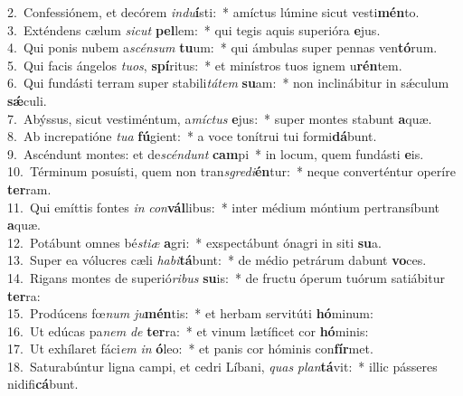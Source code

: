 {2.~}Confessiónem, et decórem \textit{in}\textit{du}\textbf{í}sti:~* amíctus lúmine sicut vesti\textbf{mén}to.\\
{3.~}Exténdens cælum \textit{si}\textit{cut} \textbf{pel}lem:~* qui tegis aquis superióra \textbf{e}jus.\\
{4.~}Qui ponis nubem a\textit{scén}\textit{sum} \textbf{tu}um:~* qui ámbulas super pennas ven\textbf{tó}rum.\\
{5.~}Qui facis ángelos \textit{tu}\textit{os}, \textbf{spí}ritus:~* et minístros tuos ignem u\textbf{rén}tem.\\
{6.~}Qui fundásti terram super stabili\textit{tá}\textit{tem} \textbf{su}am:~* non inclinábitur in sǽculum \textbf{sǽ}culi.\\
{7.~}Abýssus, sicut vestiméntum, a\textit{mí}\textit{ctus} \textbf{e}jus:~* super montes stabunt \textbf{a}quæ.\\
{8.~}Ab increpatióne \textit{tu}\textit{a} \textbf{fú}gient:~* a voce tonítrui tui formi\textbf{dá}bunt.\\
{9.~}Ascéndunt montes: et de\textit{scén}\textit{dunt} \textbf{cam}pi~* in locum, quem fundásti \textbf{e}is.\\
{10.~}Términum posuísti, quem non tran\textit{sgre}\textit{di}\textbf{én}tur:~* neque converténtur operíre \textbf{ter}ram.\\
{11.~}Qui emíttis fontes \textit{in} \textit{con}\textbf{vál}libus:~* inter médium móntium pertransíbunt \textbf{a}quæ.\\
{12.~}Potábunt omnes bé\textit{sti}\textit{æ} \textbf{a}gri:~* exspectábunt ónagri in siti \textbf{su}a.\\
{13.~}Super ea vólucres cæli \textit{ha}\textit{bi}\textbf{tá}bunt:~* de médio petrárum dabunt \textbf{vo}ces.\\
{14.~}Rigans montes de superió\textit{ri}\textit{bus} \textbf{su}is:~* de fructu óperum tuórum satiábitur \textbf{ter}ra:\\
{15.~}Prodúcens fœ\textit{num} \textit{ju}\textbf{mén}tis:~* et herbam servitúti \textbf{hó}minum:\\
{16.~}Ut edúcas pa\textit{nem} \textit{de} \textbf{ter}ra:~* et vinum lætíficet cor \textbf{hó}minis:\\
{17.~}Ut exhílaret fáci\textit{em} \textit{in} \textbf{ó}leo:~* et panis cor hóminis con\textbf{fír}met.\\
{18.~}Saturabúntur ligna campi, et cedri Líbani, \textit{quas} \textit{plan}\textbf{tá}vit:~* illic pásseres nidifi\textbf{cá}bunt.\\
